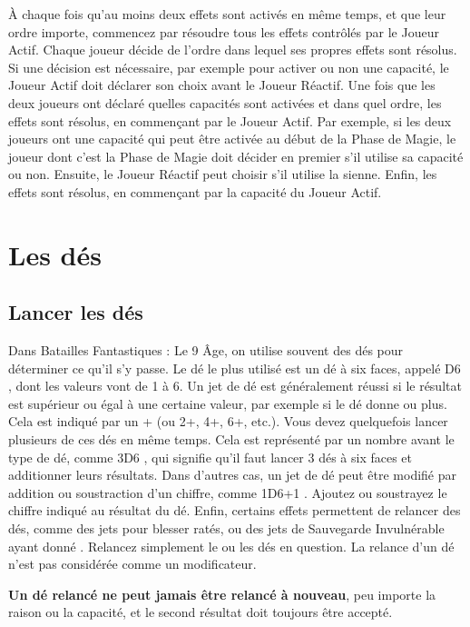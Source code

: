 À chaque fois qu'au moins deux effets sont activés en même temps, et que leur ordre importe, commencez par résoudre tous les effets contrôlés par le Joueur Actif. Chaque joueur décide de l'ordre dans lequel ses propres effets sont résolus. Si une décision est nécessaire, par exemple pour activer ou non une capacité, le Joueur Actif doit déclarer son choix avant le Joueur Réactif. Une fois que les deux joueurs ont déclaré quelles capacités sont activées et dans quel ordre, les effets sont résolus, en commençant par le Joueur Actif. Par exemple, si les deux joueurs ont une capacité qui peut être activée au début de la Phase de Magie, le joueur dont c'est la Phase de Magie doit décider en premier s'il utilise sa capacité ou non. Ensuite, le Joueur Réactif peut choisir s'il utilise la sienne. Enfin, les effets sont résolus, en commençant par la capacité du Joueur Actif.

\newpage
\section{Les dés}

\subsection{Lancer les dés}

Dans Batailles Fantastiques : Le 9\ieme{} Âge, on utilise souvent des dés pour déterminer ce qu'il s'y passe. Le dé le plus utilisé est un dé à six faces, appelé \og D6 \fg{}, dont les valeurs vont de 1 à 6. Un jet de dé est généralement réussi si le résultat est supérieur ou égal à une certaine valeur, par exemple si le dé donne  ou plus. Cela est indiqué par un + \fg{} (ou 2+, 4+, 6+, etc.). Vous devez quelquefois lancer plusieurs de ces dés en même temps. Cela est représenté par un nombre avant le type de dé, comme \og 3D6 \fg{}, qui signifie qu'il faut lancer 3 dés à six faces et additionner leurs résultats. Dans d'autres cas, un jet de dé peut être modifié par addition ou soustraction d'un chiffre, comme \og 1D6+1 \fg{}. Ajoutez ou soustrayez le chiffre indiqué au résultat du dé. Enfin, certains effets permettent de relancer des dés, comme des jets pour blesser ratés, ou des jets de Sauvegarde Invulnérable ayant donné . Relancez simplement le ou les dés en question. La relance d'un dé n'est pas considérée comme un modificateur.

\textbf{Un dé relancé ne peut jamais être relancé à nouveau}, peu importe la raison ou la capacité, et le second résultat doit toujours être accepté.

